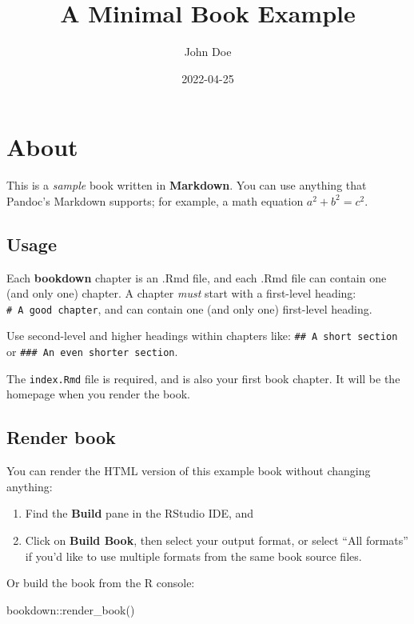 \documentclass[
]{book}
\title{A Minimal Book Example}
\author{John Doe}
\date{2022-04-25}
\newenvironment{Shaded}{\begin{snugshade}}{\end{snugshade}}
\newcommand{\FunctionTok}[1]{\textcolor[rgb]{0.00,0.00,0.00}{#1}}
\newcommand{\NormalTok}[1]{#1}
\newcommand{\SpecialCharTok}[1]{\textcolor[rgb]{0.00,0.00,0.00}{#1}}
\theoremstyle{definition}
\theoremstyle{definition}
\theoremstyle{definition}
\theoremstyle{definition}
\theoremstyle{remark}
\begin{document}
\maketitle

{
\setcounter{tocdepth}{1}
\tableofcontents
}
\hypertarget{about}{%
\chapter{About}\label{about}}

This is a \emph{sample} book written in \textbf{Markdown}. You can use anything that Pandoc's Markdown supports; for example, a math equation \(a^2 + b^2 = c^2\).

\hypertarget{usage}{%
\section{Usage}\label{usage}}

Each \textbf{bookdown} chapter is an .Rmd file, and each .Rmd file can contain one (and only one) chapter. A chapter \emph{must} start with a first-level heading: \texttt{\#\ A\ good\ chapter}, and can contain one (and only one) first-level heading.

Use second-level and higher headings within chapters like: \texttt{\#\#\ A\ short\ section} or \texttt{\#\#\#\ An\ even\ shorter\ section}.

The \texttt{index.Rmd} file is required, and is also your first book chapter. It will be the homepage when you render the book.

\hypertarget{render-book}{%
\section{Render book}\label{render-book}}

You can render the HTML version of this example book without changing anything:

\begin{enumerate}
\def\labelenumi{\arabic{enumi}.}
\item
  Find the \textbf{Build} pane in the RStudio IDE, and
\item
  Click on \textbf{Build Book}, then select your output format, or select ``All formats'' if you'd like to use multiple formats from the same book source files.
\end{enumerate}

Or build the book from the R console:

\begin{Shaded}
\begin{Highlighting}[]
\NormalTok{bookdown}\SpecialCharTok{::}\FunctionTok{render\_book}\NormalTok{()}
\end{Highlighting}
\end{Shaded}
\end{document}
